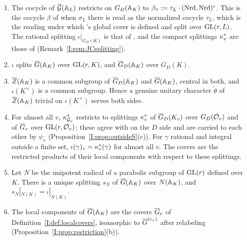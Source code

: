 \begin{proposition}\label{I:prop:global}
\begin{enumerate}[label=(\alph*)]
\item The cocycle of $\overline{\mathcal{G}}(\mathbb{A}_L)$ restricts on $G_D(\mathbb{A}_K)$ to $\beta_\tau:=\tau_L\cdot(\operatorname{Nrd},\operatorname{Nrd})^c$. This is the cocycle $\beta$ of \cite[equation~(4)]{JC26a} when $\sigma_L$ there is read as the normalized cocycle $\tau_L$, which is the reading under which \cite{JC26a}'s global cover is defined and split over $\mathrm{GL}(r,L)$. The rational splitting $\iota|_{G_D(K)}$ is that of \cite[Lemma~6.1(a),(d)]{JC26a}, and the compact splittings $\kappa^{*}_v$ are those of \cite[Lemma~6.1(d)]{JC26a} (Remark~\ref{I:rem:JCsplitting}).
\item $\iota$ splits $\overline{G}(\mathbb{A}_K)$ over $\mathrm{GL}(r,K)$, and $\overline{G}_D(\mathbb{A}_K)$ over $G_D(K)$.
\item $\overline{Z}(\mathbb{A}_K)$ is a common subgroup of $\overline{G}_D(\mathbb{A}_K)$ and $\overline{G}(\mathbb{A}_K)$, central in both, and $\iota(K^\times)$ is a common subgroup. Hence a genuine unitary character $\tilde\theta$ of $\overline{Z}(\mathbb{A}_K)$ trivial on $\iota(K^\times)$ serves both sides.
\item For almost all $v$, $\kappa^{*}_{\mathcal{G}_v}$ restricts to splittings $\kappa^{*}_v$ of $\overline{G}_D(K_v)$ over $G_D(\mathcal{O}_v)$ and of $\overline{G}_v$ over $\mathrm{GL}(r,\mathcal{O}_v)$; these agree with \cite[Lemma~6.1(d)]{JC26a} on the $D$ side and are carried to each other by $\psi_v$ (Proposition~\ref{I:prop:outsideS}(c)). For $\gamma$ rational and integral outside a finite set, $\iota(\gamma)_v=\kappa^{*}_v(\gamma)$ for almost all $v$. The covers are the restricted products of their local components with respect to these splittings.
\item Let $N$ be the unipotent radical of a parabolic subgroup of $\mathrm{GL}(r)$ defined over $K$. There is a unique splitting $s_N$ of $\overline{G}(\mathbb{A}_K)$ over $N(\mathbb{A}_K)$, and $s_N|_{N(K)}=\iota|_{N(K)}$.
\item The local components of $\overline{G}(\mathbb{A}_K)$ are the covers $\overline{G}_v$ of Definition~\ref{I:def:localcovers}, isomorphic to $\overline{G}^{(c_v)}$ after relabeling (Proposition~\ref{I:prop:restriction}(b)).
\end{enumerate}
\end{proposition}

